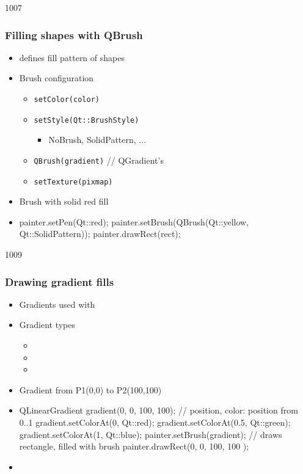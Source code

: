 \begin{slide}[fragile]{1007}\frametitle{Filling shapes with QBrush}
\begin{itemize}
  \item {} defines fill pattern of shapes
  \item Brush configuration
    \begin{itemize}
    \item \texttt{setColor(color)}
    \item \texttt{setStyle(Qt::BrushStyle)}
      \begin{itemize}
      \item NoBrush, SolidPattern, ...
      \end{itemize}
    \item \texttt{QBrush(gradient)}  // QGradient's
    \item \texttt{setTexture(pixmap)}
   \end{itemize}
    \item Brush with solid red fill    
    \item[] \begin{cpp}
painter.setPen(Qt::red);
painter.setBrush(QBrush(Qt::yellow, Qt::SolidPattern));
painter.drawRect(rect);
    \end{cpp}
\end{itemize}
\end{slide}

\begin{slide}[fragile]{1009}
\frametitle{Drawing gradient fills}
\begin{itemize}                    
  \item Gradients used with 
  \item Gradient types
  \begin{itemize}
  \item {}
  \item {}
  \item {}
  \end{itemize} 
  \item Gradient from P1(0,0) to P2(100,100)
  \item[] \begin{cpp}   
QLinearGradient gradient(0, 0, 100, 100);
// position, color: position from 0..1
gradient.setColorAt(0, Qt::red); 
gradient.setColorAt(0.5, Qt::green);
gradient.setColorAt(1, Qt::blue);
painter.setBrush(gradient);
// draws rectangle, filled with brush
painter.drawRect(0, 0, 100, 100 );
  \end{cpp}                  
  \item {}
\end{itemize}
\end{slide}

